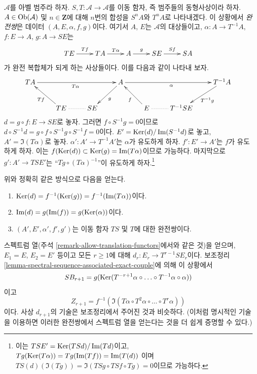 \begin{remark}[변형]
\label{remark-shifted-exact-couple}
$\mathcal{A}$를 아벨 범주라 하자.
$S, T : \mathcal{A} \to \mathcal{A}$를 이동 함자, 즉 범주들의
동형사상이라 하자. $A \in \mathop{\mathrm{Ob}}\nolimits(\mathcal{A})$ 및
$n \in \mathbf{Z}$에 대해 $n$번의 합성을 $S^nA$와 $T^nA$로
나타내겠다. 이 상황에서 {\it 완전쌍}은 데이터
$(A, E, \alpha, f, g)$이다. 여기서 $A$, $E$는
$\mathcal{A}$의 대상들이고, $\alpha : A \to T^{-1}A$,
$f : E \to A$, $g : A \to SE$는
$$
\xymatrix{
TE \ar[r]^-{Tf} &
TA \ar[r]^-{T\alpha} &
A \ar[r]^-{g} &
SE \ar[r]^{Sf} & SA
}
$$
가 완전 복합체가 되게 하는 사상들이다. 이를 다음과 같이 나타내 보자.
$$
\xymatrix{
TA \ar[rrr]_{T\alpha} & & &
A \ar[ld]^g \ar[rrr]_\alpha & & &
T^{-1}A \ar[ld]^{T^{-1}g} \\
& TE \ar[lu]^{Tf} \ar@{..}[r] & SE & &
E \ar[lu]^f \ar@{..}[r] & T^{-1}SE
}
$$
$d = g \circ f : E \to SE$로 놓자. 그러면
$f \circ S^{-1}g = 0$이므로
$d \circ S^{-1}d =
g \circ f \circ S^{-1}g \circ S^{-1}f = 0$이다.
$E' = \mathop{\mathrm{Ker}}(d)/\mathop{\mathrm{Im}}(S^{-1}d)$로 놓고, $A' = \Im(T\alpha)$로 놓자.
$\alpha' : A' \to T^{-1}A'$는 $\alpha$가 유도하게 하자.
$f' : E' \to A'$는 $f$가 유도하게 하자. 이는
$f(\mathop{\mathrm{Ker}}(d)) \subset \mathop{\mathrm{Ker}}(g) = \mathop{\mathrm{Im}}(T\alpha)$이므로 가능하다.
마지막으로 $g' : A' \to TSE'$는
``$Tg \circ (T\alpha)^{-1}$''이 유도하게 하자.\footnote{이는
$TSE' = \mathop{\mathrm{Ker}}(TSd)/\mathop{\mathrm{Im}}(Td)$이고,
$Tg(\mathop{\mathrm{Ker}}(T\alpha)) = Tg(\mathop{\mathrm{Im}}(Tf)) = \mathop{\mathrm{Im}}(T(d))$
이며 $TS(d)(\Im(Tg)) = \Im(TSg \circ TSf \circ Tg) = 0$이므로
가능하다.}

\medskip\noindent
위와 정확히 같은 방식으로 다음을 얻는다.
\begin{enumerate}
\item $\mathop{\mathrm{Ker}}(d) = f^{-1}(\mathop{\mathrm{Ker}}(g)) = f^{-1}(\mathop{\mathrm{Im}}(T\alpha))$이다.
\item $\mathop{\mathrm{Im}}(d) = g(\mathop{\mathrm{Im}}(f)) = g(\mathop{\mathrm{Ker}}(\alpha))$이다.
\item $(A', E', \alpha', f', g')$는 이동 함자 $TS$ 및 $T$에 대한
완전쌍이다.
\end{enumerate}
스펙트럼 열(주석 \ref{remark-allow-translation-functors}에서와 같은 것)을
얻으며, $E_1 = E$, $E_2 = E'$ 등이고 모든 $r \geq 1$에 대해
$d_r : E_r \to T^{r - 1}SE_r$이다. 보조정리
\ref{lemma-spectral-sequence-associated-exact-couple}에 의해 이 상황에서
$$
SB_{r + 1} =
g(\mathop{\mathrm{Ker}}(T^{-r + 1}\alpha \circ \ldots \circ T^{-1}\alpha \circ \alpha))
$$
이고
$$
Z_{r + 1} = f^{-1}(\Im(T\alpha \circ T^2\alpha \circ \ldots \circ T^r\alpha))
$$
이다. 사상 $d_{r + 1}$의 기술은 보조정리에서 주어진 것과 비슷하다.
(이처럼 명시적인 기술을 이용하면 이러한 완전쌍에서 스펙트럼 열을
얻는다는 것을 더 쉽게 증명할 수 있다.)
\end{remark}







